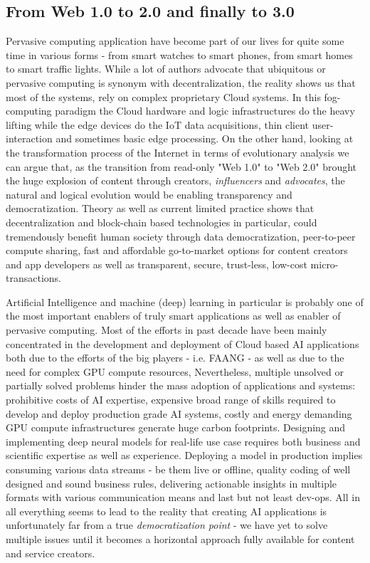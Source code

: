 \documentclass{article}
\begin{document}
\subsection{From Web 1.0 to 2.0 and finally to 3.0}
Pervasive computing application have become part of our lives for quite some time in various forms - from smart watches to smart phones, from smart homes to smart traffic lights. While a lot of authors advocate that ubiquitous or pervasive computing \cite{hansmann2003pervasive} \cite{conti2012looking} \cite{hansmann2013pervasive} is synonym with decentralization, the reality shows us that most of the systems, rely on complex proprietary Cloud systems. In this fog-computing\cite{chan2017fog} paradigm the Cloud hardware and logic infrastructures do the heavy lifting while the edge devices do  the IoT data acquisitions, thin client user-interaction and sometimes basic edge processing. On the other hand, looking at the transformation process of the Internet in terms of evolutionary analysis we can argue that, as the transition from read-only "Web 1.0" to "Web 2.0" brought the huge explosion of content through creators, \emph{influencers} and \emph{advocates}, the natural and logical evolution would be enabling transparency and democratization. Theory as well as current limited practice shows that decentralization \cite{voshmgir2019token} \cite{sunyaev2021token} and block-chain based technologies \cite{nofer2017blockchain} \cite{zheng2018blockchain} \cite{monrat2019survey} in particular, could tremendously benefit human society through data democratization, peer-to-peer compute sharing, fast and affordable go-to-market options for content creators and app developers as well as transparent, secure, trust-less, low-cost micro-transactions.

Artificial Intelligence and machine (deep) learning in particular is probably one of the most important enablers of truly smart applications as well as enabler of pervasive computing. Most of the efforts in past decade have been mainly concentrated in the development and deployment of Cloud based AI applications both due to the efforts of the big players - i.e. FAANG\cite{pisal2021rise} - as well as due to the need for complex GPU compute resources, Nevertheless, multiple  unsolved or partially solved problems hinder the mass adoption of applications and systems: prohibitive costs of AI expertise, expensive broad range of skills required to develop and deploy production grade AI systems, costly and energy demanding GPU compute infrastructures generate huge carbon footprints. Designing and implementing deep neural models for real-life use case  requires both business and scientific expertise as well as experience. Deploying a model in production implies consuming various data streams - be them live or offline, quality coding of well designed and sound business rules, delivering actionable insights in multiple formats with various communication means and last but not least dev-ops. All in all everything seems to lead to the reality that creating AI applications is unfortunately far from a true \emph{democratization point} - we have yet to solve multiple issues until it becomes a horizontal approach fully available for content and service creators. 
\end{document}
